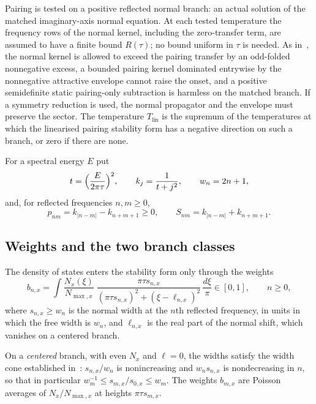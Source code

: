 \documentclass[10pt]{article}
\theoremstyle{remark}
\newcommand{\Tlin}{T_{\mathrm{lin}}}
\begin{document}
Pairing is tested on a positive reflected normal branch: an actual solution of the matched imaginary-axis normal equation. At each tested temperature the frequency rows of the normal kernel, including the zero-transfer term, are assumed to have a finite bound $R(\tau)$; no bound uniform in $\tau$ is needed. As in~\cite{optimum}, the normal kernel is allowed to exceed the pairing transfer by an odd-folded nonnegative excess, a bounded pairing kernel dominated entrywise by the nonnegative attractive envelope cannot raise the onset, and a positive semidefinite static pairing-only subtraction is harmless on the matched branch. If a symmetry reduction is used, the normal propagator and the envelope must preserve the sector. The temperature $\Tlin$ is the supremum of the temperatures at which the linearised pairing stability form has a negative direction on such a branch, or zero if there are none.

For a spectral energy $E$ put
\[
t=\Bigl(\frac{E}{2\pi\tau}\Bigr)^2,\qquad k_j=\frac1{t+j^2},\qquad w_n=2n+1,
\]
and, for reflected frequencies $n,m\ge0$,
\[
p_{nm}=k_{|n-m|}-k_{n+m+1}\ge0,\qquad S_{nm}=k_{|n-m|}+k_{n+m+1}.
\]

\subsection{Weights and the two branch classes}

The density of states enters the stability form only through the weights
\[
b_{n,x}=\int\frac{N_x(\xi)}{N_{\max,x}}\;\frac{\pi\tau s_{n,x}}{(\pi\tau s_{n,x})^2+(\xi-\ell_{n,x})^2}\,\frac{d\xi}{\pi}\in[0,1],\qquad n\ge0,
\]
where $s_{n,x}\ge w_n$ is the normal width at the $n$th reflected frequency, in units in which the free width is $w_n$, and $\ell_{n,x}$ is the real part of the normal shift, which vanishes on a centered branch.

On a \emph{centered} branch, with even $N_x$ and $\ell=0$, the widths satisfy the width cone established in~\cite{predecessor,optimum}: $s_{n,x}/w_n$ is nonincreasing and $w_ns_{n,x}$ is nondecreasing in $n$, so that in particular $w_m^{-1}\le s_{m,x}/s_{0,x}\le w_m$. The weights $b_{m,x}$ are Poisson averages of $N_x/N_{\max,x}$ at heights $\pi\tau s_{m,x}$.
\end{document}
